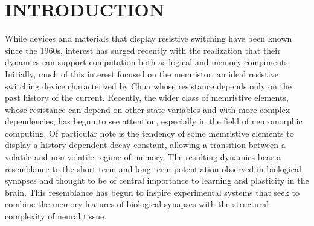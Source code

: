 \documentclass[aps,prl,reprint,groupedaddress]{revtex4-1}
\begin{document}
\pacs{}

\maketitle


\section{INTRODUCTION}

While devices and materials that display resistive switching have been known
since the 1960s, interest has surged recently with the realization that their
dynamics can support computation both as logical and memory components.
Initially, much of this interest focused on the memristor, an ideal
resistive switching device characterized by Chua whose resistance depends
only on the past
history of the current.  Recently, the wider class of memristive elements, whose
resistance can depend on other state variables and with more complex
dependencies, has begun to see attention, especially in the field of
neuromorphic computing.  Of particular note is the tendency of some memristive
elements to display a history dependent decay constant, allowing a transition
between a volatile and non-volatile regime of memory.  The resulting dynamics
bear a resemblance to the short-term and long-term potentiation observed in
biological synapses and thought to be of central importance to learning and
plasticity in the brain.  This resemblance has begun to inspire experimental
systems that seek to combine the memory features of biological synapses with
the structural complexity of neural tissue.
\end{document}

